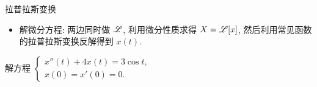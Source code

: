 \documentclass[12pt,handout]{ctexbeamer}
\begin{document}
\begin{frame}{拉普拉斯变换}
\begin{itemize}
\item 解微分方程: 两边同时做 $\mathscr{L}$, 利用微分性质求得 $X=\mathscr{L}[x]$, 然后利用常见函数的拉普拉斯变换反解得到 $x(t)$.
\end{itemize}
\begin{exercise}
解方程 
  $\begin{cases}
    x''(t)+4x(t)=3\cos t,& \\
    x(0)=x'(0)=0.&
  \end{cases}$
\end{exercise}
\end{frame}
\end{document}
